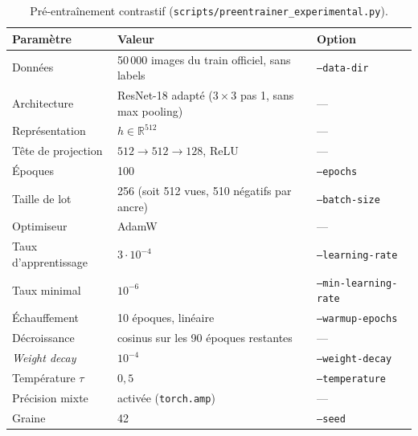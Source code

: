 \documentclass[11pt,a4paper]{article}
\begin{document}
\begin{table}[htbp]
\centering\small
\caption{Pré-entraînement contrastif (\texttt{scripts/preentrainer\_experimental.py}).}
\begin{tabularx}{\textwidth}{@{}lXl@{}}
\toprule
\textbf{Paramètre} & \textbf{Valeur} & \textbf{Option} \\
\midrule
Données & 50\,000 images du train officiel, sans labels & \texttt{--data-dir} \\
Architecture & ResNet-18 adapté ($3\times3$ pas 1, sans max pooling) & --- \\
Représentation & $h \in \mathbb{R}^{512}$ & --- \\
Tête de projection & $512 \rightarrow 512 \rightarrow 128$, ReLU & --- \\
Époques & 100 & \texttt{--epochs} \\
Taille de lot & 256 (soit 512 vues, 510 négatifs par ancre) & \texttt{--batch-size} \\
Optimiseur & AdamW & --- \\
Taux d'apprentissage & $3 \cdot 10^{-4}$ & \texttt{--learning-rate} \\
Taux minimal & $10^{-6}$ & \texttt{--min-learning-rate} \\
Échauffement & 10 époques, linéaire & \texttt{--warmup-epochs} \\
Décroissance & cosinus sur les 90 époques restantes & --- \\
\emph{Weight decay} & $10^{-4}$ & \texttt{--weight-decay} \\
Température $\tau$ & $0{,}5$ & \texttt{--temperature} \\
Précision mixte & activée (\texttt{torch.amp}) & --- \\
Graine & 42 & \texttt{--seed} \\
\bottomrule
\end{tabularx}
\end{table}
\end{document}
